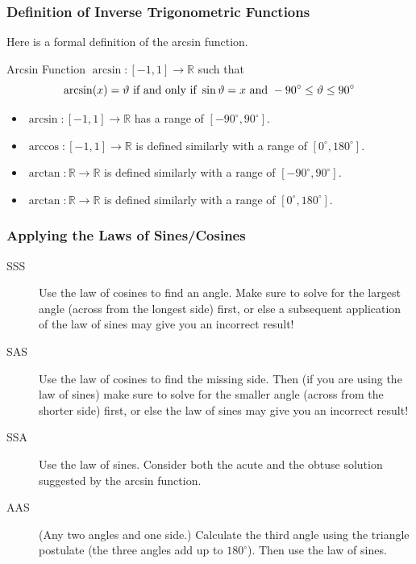 \documentclass[xcolor=dvipsnames]{beamer}
\begin{document}
\begin{frame}
  \frametitle{Definition of Inverse Trigonometric Functions}
  Here is a formal definition of the arcsin function.
  \begin{block}{Arcsin Function}
    $\arcsin:[-1,1]\rightarrow\mathbb{R}$ such that
    \begin{equation}
      \label{eq:xaeshaut}
    \arcsin(x)=\vartheta\mbox{ if and only if }\sin\vartheta=x\mbox{
      and }-90^{\circ}\leq\vartheta\leq{}90^{\circ}\notag
    \end{equation}
  \end{block}

  \bigskip
  
  \begin{itemize}
  \item $\arcsin:[-1,1]\rightarrow\mathbb{R}$ has a range of $[-90^{\circ},90^{\circ}]$.
  \item $\arccos:[-1,1]\rightarrow\mathbb{R}$ is defined similarly
with a range of $[0^{\circ},180^{\circ}]$.
\item $\arctan:\mathbb{R}\rightarrow\mathbb{R}$ is defined similarly
with a range of $[-90^{\circ},90^{\circ}]$.
\item $\arctan:\mathbb{R}\rightarrow\mathbb{R}$ is defined similarly
with a range of $[0^{\circ},180^{\circ}]$.
  \end{itemize}
\end{frame}


\begin{frame}
  \frametitle{Applying the Laws of Sines/Cosines}
  \begin{description}
  \item[SSS] Use the law of cosines to find an angle. Make sure to
    solve for the largest angle (across from the longest side) first,
    or else a subsequent application of the law of sines may give you
    an incorrect result!
  \item[SAS] Use the law of cosines to find the missing side. Then (if
    you are using the law of sines) make sure to solve for the smaller
    angle (across from the shorter side) first, or else the law of
    sines may give you an incorrect result!
  \item[SSA] Use the law of sines. Consider both the acute \alert{and
      the obtuse} solution suggested by the arcsin function. 
  \item[AAS] (Any two angles and one side.) Calculate the third angle
    using the triangle postulate (the three angles add up to
    $180^{\circ}$). Then use the law of sines.
  \end{description}
\end{frame}
\end{document}
